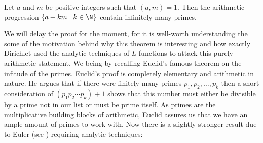       \begin{theorem}\label{thm:Dirichlet's_theorem_on_primes_in_arithmetic_progressions}
        Let $a$ and $m$ be positive integers such that $(a,m) = 1$. Then the arithmetic progression $\{a+km \mid k \in \N\}$ contain infinitely many primes.
      \end{theorem}

      We will delay the proof for the moment, for it is well-worth understanding the some of the motivation behind why this theorem is interesting and how exactly Dirichlet used the analytic techniques of $L$-functions to attack this purely arithmetic statement. We being by recalling Euclid's famous theorem on the infitude of the primes. Euclid's proof is completely elementary and arithmetic in nature. He argues that if there were finitely many primes $p_{1},p_{2},\ldots,p_{k}$ then a short consideration of $(p_{1}p_{2} \cdots p_{k})+1$ shows that this number must either be divisible by a prime not in our list or must be prime itself. As primes are the multiplicative building blocks of arithmetic, Euclid assures us that we have an ample amount of primes to work with. Now there is a slightly stronger result due to Euler (see \cite{euler1744variae}) requiring analytic techniques:

